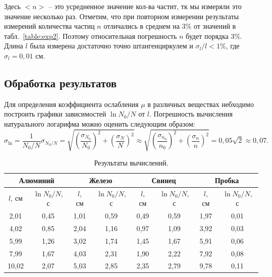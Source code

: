 \documentclass[a4paper, 12pt]{article}%
\begin{document}
	
		Здесь $<n>$ -- это усредненное значение кол-ва частит, тк мы измеряли это значение несколько раз. Отметим, что при повторном измерении результаты измерений количества частиц $n$ отличались в среднем на 3\% от значений в табл.~\ref{table:exp2}. Поэтому относительная погрешность $n$ будет порядка 3\%. Длина $l$ была измерена достаточно точно штангенциркулем и $\sigma_l / l < 1\%$, где $\sigma_l = 0,01$ см.
		 
		 
	\newpage
	\subsection{Обработка результатов}
		Для определения коэффициента ослабления $\mu$ в различных веществах небходимо построить графики  зависимостей $\ln N_0/N$ от $l$. Погрешность вычисления натурального логарифма можно оценить следующим образом:
		\begin{equation*}
			\sigma_{\ln} = \frac{1}{N_0/N} \sigma_{N_0/N} = \sqrt{\left(\frac{\sigma_{N_0}}{N_0}\right)^2+\left(\frac{\sigma_{N}}{N}\right)^2} \approx \sqrt{\left(\frac{\sigma_{n_0}}{n_0}\right)^2+\left(\frac{\sigma_{n}}{n}\right)^2} = 0,05\sqrt{2} \approx 0,07.
		\end{equation*}
		
		\begin{table}[!h]
		\begin{center}
			\caption{Результаты вычислений.}
			\label{table:exp3}
			\begin{tabular}{|c|c|c|c|c|c|c|c|}
				\hline
				\multicolumn{2}{|c|}{Алюминий} & \multicolumn{2}{c|}{Железо} & \multicolumn{2}{c|}{Свинец} & \multicolumn{2}{c|}{Пробка} \\ \hline
				$l$, см    & $\ln N_0/N$, с    & $l$, см   & $\ln N_0/N$, с  & $l$, см   & $\ln N_0/N$, с  & $l$, см       & $\ln N_0/N$, с      \\ \hline
2,01       & 0,45              & 1,01      & 0,59            & 0,49      & 0,59            & 1,97          & 0,01                \\ \hline
4,02       & 0,85              & 2,04      & 1,16            & 0,97      & 1,09            & 3,92          & 0,03                \\ \hline
5,99       & 1,26              & 3,02      & 1,74            & 1,45      & 1,67            & 5,91          & 0,06                \\ \hline
7,99       & 1,67              & 4,03      & 2,31            & 1,90      & 2,22            & 7,92          & 0,08                \\ \hline
10,02      & 2,07              & 5,03      & 2,85            & 2,35      & 2,79            & 9,78          & 0,11                \\ \hline
			\end{tabular}
		\end{center}
		\end{table}
		
\end{document}

